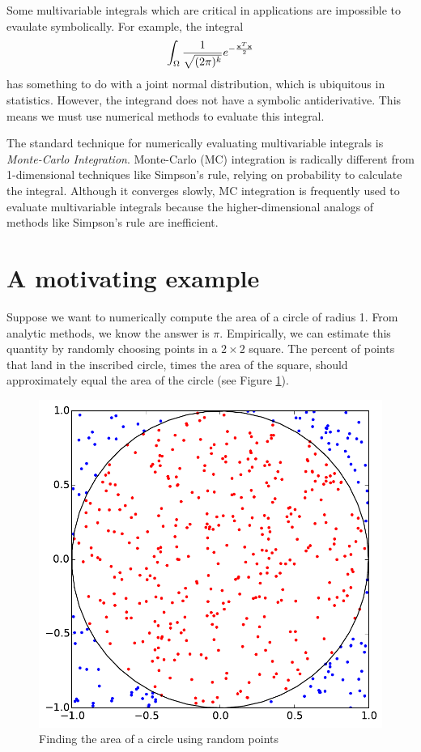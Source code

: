 
Some multivariable integrals which are critical in applications are impossible to evaulate symbolically.
For example, the integral
\[
\int_{\Omega} \frac{1}{\sqrt{(2 \pi)^k}} e^{- \frac{\bold{x}^T\bold{x}}{2}}
\]
has something to do with a joint normal distribution, which is ubiquitous in statistics.
However, the integrand does not have a symbolic antiderivative.
This means we must use numerical methods to evaluate this integral.

The standard technique for numerically evaluating multivariable integrals is \emph{Monte-Carlo Integration}.
Monte-Carlo (MC) integration is radically different from 1-dimensional techniques like Simpson's rule, relying on probability to calculate the integral.
Although it converges slowly, MC integration is frequently used to evaluate multivariable integrals because the higher-dimensional analogs of methods like Simpson's rule are inefficient. 

\section*{A motivating example}
Suppose we want to numerically compute the area of a circle of radius 1.
From analytic methods, we know the answer is $\pi$.
Empirically, we can estimate this quantity by randomly choosing points in a $2 \times 2$ square.
The percent of points that land in the inscribed circle, times the area of the square, should approximately equal the area of the circle (see Figure \ref{fig:MCCircle}).

\begin{figure}
\includegraphics[width=.7\textwidth]{MC_Circle.pdf}
\caption{Finding the area of a circle using random points}
\label{fig:MCCircle}
\end{figure}

